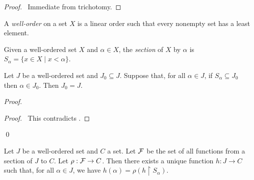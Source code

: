 \begin{proof}
    \pf\ Immediate from trichotomy.
\end{proof}

\begin{definition}
    A \emph{well-order} on a set $X$ is a linear order such that every nonempty set has a least element.
\end{definition}

\begin{definition}[Section]
    Given a well-ordered set $X$ and $\alpha \in X$, the \emph{section} of $X$ by $\alpha$ is $S_\alpha = \{ x \in X \mid x < \alpha \}$.
\end{definition}

\begin{theorem}
    Let $J$ be a well-ordered set and $J_0 \subseteq J$. Suppose that, for all $\alpha \in J$, if $S_\alpha \subseteq J_0$ then $\alpha \in J_0$.
    Then $J_0 = J$.
\end{theorem}

\begin{proof}
    \pf
    \qedstep
    \begin{proof}
        \pf\ This contradicts .
    \end{proof}
    \qed
\end{proof}

\begin{theorem}
    Let $J$ be a well-ordered set and $C$ a set. Let $\mathcal{F}$ be the set of all functions from a section of $J$ to $C$.
    Let $\rho : \mathcal{F} \rightarrow C$. Then there exists a unique function $h : J \rightarrow C$ such that, for all $\alpha \in J$,
    we have $h(\alpha) = \rho(h \restriction S_\alpha)$.
\end{theorem}

